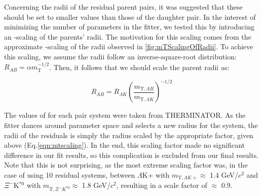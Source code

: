\documentclass[../AnalysisNoteJBuxton.tex]{subfiles}
\begin{document}
Concerning the radii of the residual parent pairs, it was suggested that these should be set to smaller values than those of the daughter pair.  In the interest of minimizing the number of parameters in the fitter, we tested this by introducing an \mt-scaling of the parents' radii.  The motivation for this scaling comes from the approximate \mt-scaling of the radii observed in \ref{fig:mTScalingOfRadii}.  To achieve this scaling, we assume the radii follow an inverse-square-root distribution: $R_{AB} = \alpha m_{\mathrm{T}}^{-1/2}$.  Then, it follows that we should scale the parent radii as:

\begin{equation}
R_{AB} = R_{\Lambda K}\left(\frac{m_{\mathrm{T},AB}}{m_{\mathrm{T},\Lambda K}}\right)^{-1/2}
\label{eqn:mtscaling}
\end{equation}

The values of \mt for each pair system were taken from THERMINATOR.  As the fitter dances around parameter space and selects a new radius for the \LamK system, the radii of the residuals is simply the \LamK radius scaled by the appropriate factor, given above (Eq.\ref{eqn:mtscaling}).  In the end, this scaling factor made no significant difference in our fit results, so this complication is excluded from our final results.  Note that this is not surprising, as the most extreme scaling factor was, in the case of using 10 residual systems, between $\Lambda$K+ with $m_{\mathrm{T},\Lambda K+} \approx$ 1.4 GeV/$c^{2}$ and $\Xi^{-}$K$^{*0}$ with $m_{\mathrm{T},\Xi^{-} K^{*0}} \approx$ 1.8 GeV/$c^{2}$, resulting in a scale factor of $\approx$ 0.9.
\end{document}
